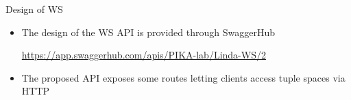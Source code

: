 \documentclass[presentation]{beamer}\mode<presentation>{\usetheme{AMSCesenaPurpleAndGold}}
\begin{document}
\begin{frame}[allowframebreaks]{Design of \linda{} WS}
    \begin{itemize}
        \item The design of the \linda{} WS \alert{API} is provided through SwaggerHub
        \begin{center}
            \url{https://app.swaggerhub.com/apis/PIKA-lab/Linda-WS/2}
        \end{center}
        
        \vspace{.3cm}
        
        \item The proposed API exposes some routes letting clients access tuple spaces via HTTP
        
        \framebreak
        
        
        
            
            
            

\end{itemize}
\end{frame}
\end{document}
